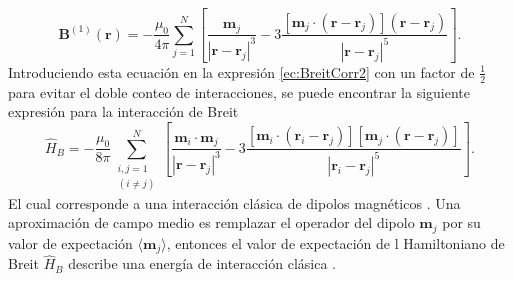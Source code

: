 \begin{equation}
	\pmb{B}^{(1)} (\pmb{r}) = - \frac{\mu_0}{4 \pi } \sum_{j=1}^N \left[ \frac{\pmb{m}_j}{|\pmb{r}-\pmb{r}_j|^3} - 3 \frac{[\pmb{m}_j \cdot (\pmb{r}-\pmb{r}_j)](\pmb{r}-\pmb{r}_j)}{|\pmb{r}-\pmb{r}_j|^5} \right]. \label{ec:B1}
\end{equation} 
Introduciendo esta ecuaci\'on en la expresi\'on \ref{ec:BreitCorr2} con un factor de $\frac{1}{2}$ para evitar el doble conteo de interacciones, se puede encontrar la siguiente expresi\'on para la interacci\'on de Breit \cite{PhysRevB.59.4699}
\begin{equation}
	\hat{H}_B = - \frac{\mu_0}{8 \pi } \sum_{\substack{i,j = 1 \\ (i \not = j)}}^N \left[ \frac{\pmb{m}_i \cdot \pmb{m}_j}{|\pmb{r}-\pmb{r}_j|^3} - 3 \frac{[\pmb{m}_i \cdot (\pmb{r}_i-\pmb{r}_j)][\pmb{m}_j \cdot (\pmb{r}-\pmb{r}_j)]}{|\pmb{r}_i-\pmb{r}_j|^5} \right]. \label{ec:BreitCorr3}
\end{equation}
El cual corresponde a una interacci\'on cl\'asica de dipolos magn\'eticos \cite{PhysRevB.59.4699, Jackson-1975}. Una aproximaci\'on de campo medio es remplazar el operador del dipolo $\pmb{m}_j$ por su valor de expectaci\'on $\langle \pmb{m}_j \rangle$, entonces el valor de expectaci\'on de l Hamiltoniano de Breit $\hat{H}_B$ describe una energ\'ia de interacci\'on cl\'asica \cite{Jackson-1975}.